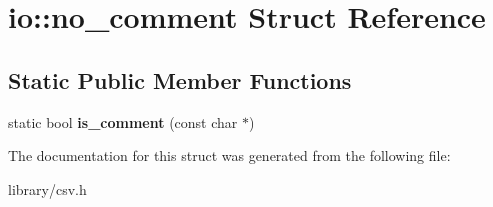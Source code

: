 \hypertarget{structio_1_1no__comment}{}\section{io\+:\+:no\+\_\+comment Struct Reference}
\label{structio_1_1no__comment}
\subsection*{Static Public Member Functions}
\begin{DoxyCompactItemize}
\item 
\mbox{\label{structio_1_1no__comment_a52b252547482e28edd076ee2224bc8d8}} 
static bool {\bfseries is\+\_\+comment} (const char $\ast$)
\end{DoxyCompactItemize}


The documentation for this struct was generated from the following file\+:\begin{DoxyCompactItemize}
\item 
library/csv.\+h\end{DoxyCompactItemize}
